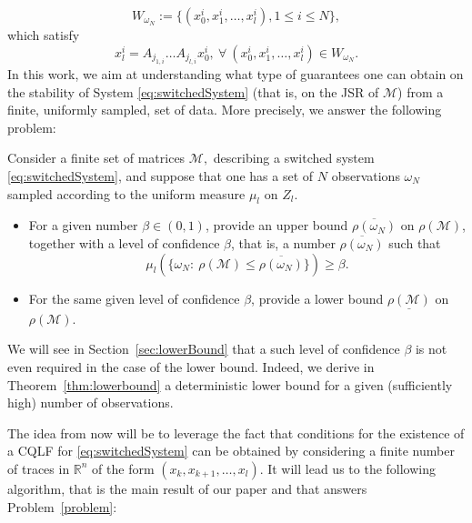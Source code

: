 \begin{equation}
W_{\omega_N} := \{(x_0^i,x_1^i, \dots, x_l^i), 1 \leq i \leq N \},
\end{equation}
which satisfy $$x_l^i= A_{j_{1,i}} \dots A_{j_{l,i}} x_0^i, \ \forall\ (x_0^i,x_1^i,\dots, x_l^i) \in W_{\omega_N}.$$
In this work, we aim at understanding what type of guarantees one can obtain on the stability of System \eqref{eq:switchedSystem} (that is, on the JSR of $\mathcal{M}$) from a finite, uniformly sampled, set of data. More precisely, we answer the following problem:
\begin{prob}\label{problem} 
Consider a finite set of matrices $\mathcal{M},$ describing a switched system \eqref{eq:switchedSystem}, and suppose that one has a set of $N$ observations $\omega_N$ sampled according to the uniform measure $\mu_l$ on $Z_l$.
\begin{itemize}
\item For a given number $\beta \in (0,1)$, provide an upper bound $\overline{\rho(\omega_N)}$ on $\rho(\mathcal{M})$, together with a level of confidence $\beta$, that is, a number $\overline{\rho(\omega_N)}$ such that $$\mu_l \left( \{\omega_N: \ \rho(\mathcal{M}) \leq \overline{\rho(\omega_N)} \} \right) \geq \beta.$$
\item For the same given level of confidence $\beta$, provide a lower bound $\underline{\rho(\mathcal{M})}$ on $\rho(\mathcal{M})$.
\end{itemize}
\end{prob}
\begin{rem}
We will see in Section~\ref{sec:lowerBound} that a such level of confidence $\beta$ is not even required in the case of the lower bound. Indeed, we derive in Theorem~\ref{thm:lowerbound} a deterministic lower bound for a given (sufficiently high) number of observations. 
\end{rem}
The idea from now will be to leverage the fact that conditions for the existence of a CQLF for \eqref{eq:switchedSystem} can be obtained by considering a finite number of traces in $\mathbb{R}^n$ of the form $(x_k,x_{k+1}, \dots, x_{l})$. It will lead us to the following algorithm, that is the main result of our paper and that answers Problem~\ref{problem}:
